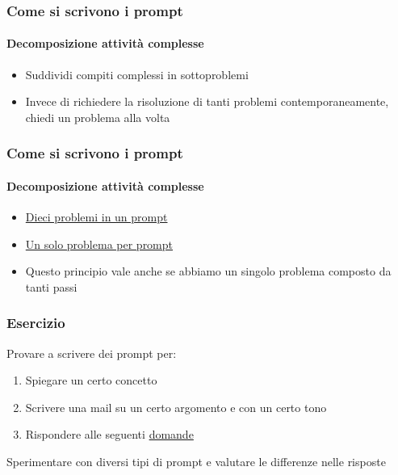 \begin{contentframe}
    \frametitle{Come si scrivono i prompt}
    \framesubtitle{Decomposizione attività complesse}

    \begin{itemize}
        \item Suddividi compiti complessi in sottoproblemi

        \bigskip
        \item Invece di richiedere la risoluzione di tanti problemi contemporaneamente, chiedi un problema alla volta
    \end{itemize}
\end{contentframe}

\begin{exampleframe}
    \frametitle{Come si scrivono i prompt}
    \framesubtitle{Decomposizione attività complesse}

    \begin{itemize}
        \item \href{https://chatgpt.com/share/675be9d5-8804-8003-b24a-851e8edf3401}{Dieci problemi in un prompt}
        \item \href{https://chatgpt.com/share/675bef6b-fa34-8003-8932-b1b662061efe}{Un solo problema per prompt}

        \bigskip
        \item Questo principio vale anche se abbiamo un singolo problema composto da tanti passi
    \end{itemize}
\end{exampleframe}

\begin{exerciseframe}
    \frametitle{Esercizio}

    Provare a scrivere dei prompt per:
    \begin{enumerate}
        \item Spiegare un certo concetto
        \item Scrivere una mail su un certo argomento e con un certo tono
        \item Rispondere alle seguenti \href{https://raw.githubusercontent.com/DavidePonzini/didattica/refs/heads/main/quesiti_medie.md}{domande}
    \end{enumerate}

    \bigskip
    Sperimentare con diversi tipi di prompt e valutare le differenze nelle risposte
\end{exerciseframe}


